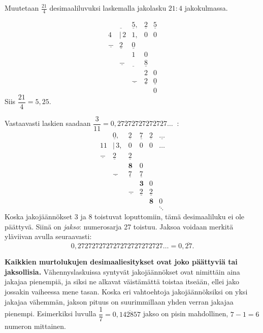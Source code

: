 \begin{esimerkki}
Muutetaan $\frac{21}{4}$ desimaaliluvuksi laskemalla jakolasku $21 : 4$ jakokulmassa.

\[ 
\begin{array}{cccccc}
 & \underline{ \ \ } & \underline{5}, & \underline{2} & \underline{5} \\
 4 & \!\!|\,2 & 1, & 0 & 0 \\
 \underline{-} & \underline{2}& \underline{0} \\
 & & 1 &0 \\
 & \underline{-} &\underline{ \ \ }  & \underline{8} \\
 & & & 2 & 0 \\
 & & \underline{-} & \underline{2} & \underline{0} \\
 & &  & & 0
\end{array}
\]
Siis $\dfrac{21}{4} = 5,25$.
\end{esimerkki}

Vastaavasti laskien saadaan $\dfrac{3}{11}=0,27272727272727\ldots \ $ :
\[ 
\begin{array}{cccccc}
 & \underline{ 0}, & \underline{2} & \underline{7} & \underline{2} & 
 \underline{\ldots} \\
 11 & \!\!|\,3, & 0 & 0 & 0 & \ldots \\
 \underline{-} & \underline{2}& \underline{2} \\
 & & \boldsymbol{8} &0 \\
 & \underline{-} &\underline{ 7 }  & \underline{7} \\
 & & & \boldsymbol{3} & 0 \\
 & & \underline{-} & \underline{2} & \underline{2} \\
 & &  & & \boldsymbol{8} & 0 \\
 & & & & & \ddots
\end{array}
\]
Koska jakojäännökset 3 ja 8 toistuvat loputtomiin, tämä desimaaliluku
ei ole päättyvä. Siinä on \emph{jakso}: numerosarja 27 toistuu.
Jaksoa voidaan merkitä yläviivan avulla seuraavasti:
\[ 0,272727272727272727272727\ldots = 0,\overline{27}. \]

{\bf Kaikkien murtolukujen desimaaliesitykset ovat joko päättyviä tai jaksollisia.}
Vähennyslaskuissa syntyvät jakojäännökset ovat nimittäin aina jakajaa pienempiä, ja siksi
ne alkavat väistämättä toistaa itseään, ellei jako jossakin vaiheessa mene tasan.
Koska eri vahtoehtoja jakojäännöksiksi on yksi jakajaa vähemmän,
jakson pituus on suurimmillaan yhden verran jakajaa pienempi. Esimerkiksi luvulla
$\dfrac{1}{7}=0,\overline{142857}$ jakso on pisin mahdollinen, $7-1=6$ numeron mittainen.

